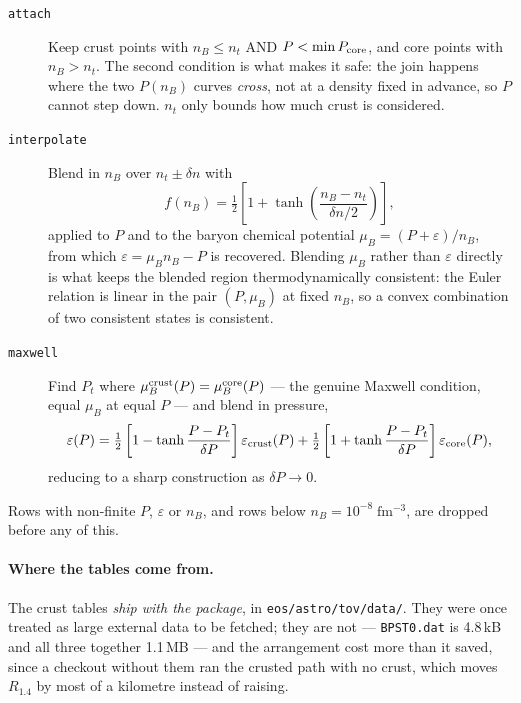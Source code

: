 \documentclass[aps,prc,onecolumn,superscriptaddress,nofootinbib,10pt]{revtex4-2}
\newcommand{\nB}{n_B}
\begin{document}
\begin{description}
\item[\texttt{attach}] Keep crust points with $\nB \le n_t$ AND
  $P < \min P_{\rm core}$, and core points with $\nB > n_t$. The second
  condition is what makes it safe: the join happens where the two $P(\nB)$
  curves \emph{cross}, not at a density fixed in advance, so $P$ cannot step
  down. $n_t$ only bounds how much crust is considered.

\item[\texttt{interpolate}] Blend in $\nB$ over $n_t \pm \delta n$ with
  \begin{equation}
  f(\nB) = \tfrac12\left[1 + \tanh\!\left(\frac{\nB - n_t}{\delta n/2}\right)\right] ,
  \label{eq:blend_n}
  \end{equation}
  applied to $P$ and to the baryon chemical potential
  $\mu_B = (P + \varepsilon)/\nB$, from which
  $\varepsilon = \mu_B \nB - P$ is recovered. Blending $\mu_B$ rather than
  $\varepsilon$ directly is what keeps the blended region thermodynamically
  consistent: the Euler relation is linear in the pair $(P, \mu_B)$ at fixed
  $\nB$, so a convex combination of two consistent states is consistent.

\item[\texttt{maxwell}] Find $P_t$ where $\mu_B^{\rm crust}(P) =
  \mu_B^{\rm core}(P)$ --- the genuine Maxwell condition, equal $\mu_B$ at equal
  $P$ --- and blend in pressure,
  \begin{equation}
  \varepsilon(P) = \tfrac12\left[1 - \tanh\frac{P - P_t}{\delta P}\right]
                     \varepsilon_{\rm crust}(P)
                 + \tfrac12\left[1 + \tanh\frac{P - P_t}{\delta P}\right]
                     \varepsilon_{\rm core}(P) ,
  \label{eq:blend_P}
  \end{equation}
  reducing to a sharp construction as $\delta P \to 0$.
\end{description}

\noindent
Rows with non-finite $P$, $\varepsilon$ or $\nB$, and rows below
$\nB = 10^{-8}\;\mathrm{fm^{-3}}$, are dropped before any of this.

\paragraph{Where the tables come from.} The crust tables \emph{ship with the
package}, in \texttt{eos/astro/tov/data/}. They were once treated as large
external data to be fetched; they are not --- \texttt{BPST0.dat} is 4.8\,kB and
all three together 1.1\,MB --- and the arrangement cost more than it saved, since
a checkout without them ran the crusted path with no crust, which moves
$R_{1.4}$ by most of a kilometre instead of raising.
\end{document}
